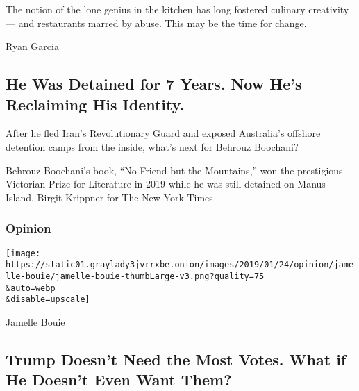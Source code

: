 The notion of the lone genius in the kitchen has long fostered culinary
creativity --- and restaurants marred by abuse. This may be the time for
change.

\href{/2020/08/04/dining/chef-restaurant-culture.html}{}

Ryan Garcia

\href{/2020/08/04/magazine/behrouz-boochani-australia.html}{}

\hypertarget{he-was-detained-for-7-years-now-hes-reclaiming-his-identity}{%
\subsection{He Was Detained for 7 Years. Now He's Reclaiming His
Identity.}\label{he-was-detained-for-7-years-now-hes-reclaiming-his-identity}}

After he fled Iran's Revolutionary Guard and exposed Australia's
offshore detention camps from the inside, what's next for Behrouz
Boochani?

\href{/2020/08/04/magazine/behrouz-boochani-australia.html}{}

Behrouz Boochani's book, ``No Friend but the Mountains,'' won the
prestigious Victorian Prize for Literature in 2019 while he was still
detained on Manus Island. Birgit Krippner for The New York Times

\href{https://www.nytimes3xbfgragh.onion/section/opinion?pagetype=Homepage\&action=click\&module=Opinion}{}

\hypertarget{opinion}{%
\subsubsection{Opinion}\label{opinion}}

\href{/2020/08/04/opinion/trump-2020-electoral-college.html}{}

\texttt{[image: https://static01.graylady3jvrrxbe.onion/images/2019/01/24/opinion/jamelle-bouie/jamelle-bouie-thumbLarge-v3.png?quality=75\\\&auto=webp\\\&disable=upscale]}

Jamelle Bouie

\hypertarget{trump-doesnt-need-the-most-votes-what-if-he-doesnt-even-want-them}{%
\subsection{Trump Doesn't Need the Most Votes. What if He Doesn't Even
Want
Them?}\label{trump-doesnt-need-the-most-votes-what-if-he-doesnt-even-want-them}}

